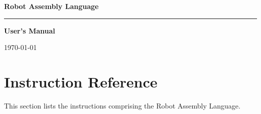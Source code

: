\documentclass[12pt,a4paper]{article}
\begin{document}
\pagestyle{fancy}
\fancyhead{}
\fancyfoot[C]{\noindent\rule{\textwidth}{0.5pt}\par-\thepage-}

\begin{titlepage}
	\centering
	{\Huge\bfseries Robot Assembly Language\par}
	\vspace{1cm}
	\noindent\rule{\textwidth}{2pt}\par
	\vspace{4cm}
	{\Large\bfseries User's Manual\par}

	\vfill

	{\large \today\par}
\end{titlepage}

\tableofcontents
\pagebreak

\section{Instruction Reference}
This section lists the instructions comprising the Robot Assembly Language.
\pagebreak


\end{document}
